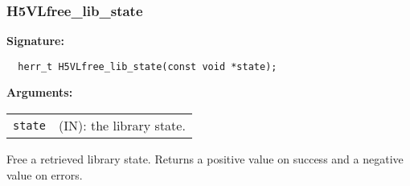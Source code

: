 \subsubsection{H5VLfree\_lib\_state}
\begin{mdframed}[style=bgbox]
\textbf{Signature:}
\begin{lstlisting}
  herr_t H5VLfree_lib_state(const void *state);
\end{lstlisting}
\textbf{Arguments:}\\
\begin{tabular}{l p{13.5cm}}
 {\tt state} & (IN): the library state.\\
\end{tabular}
\end{mdframed}
Free a retrieved library state.
Returns a positive value on success and a negative value on errors.
\bigskip


